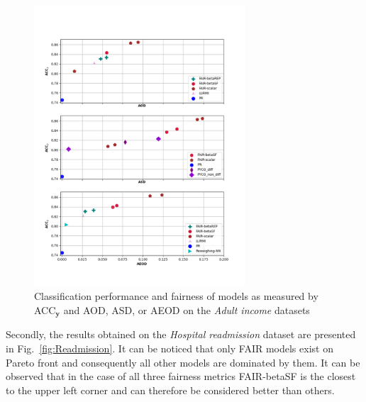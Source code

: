 \documentclass[preprint,12pt]{elsarticle}
\begin{document}
\begin{figure}
	\center
	\includegraphics[angle=0, width=0.7\textwidth]{Adult_ACC.png}
	\captionsetup{justification=centering}
	\caption{Classification performance and fairness of models as measured by ACC$_\mathbf{y}$ and AOD, ASD, or AEOD on the \textit{Adult income} datasets}
	\label{fig:Adult}
	\vskip -0.2in
\end{figure}

Secondly, the results obtained on the \textit{Hospital readmission} dataset are presented in Fig.~\ref{fig:Readmission}. It can be noticed that only FAIR models exist on Pareto front and consequently all other models are dominated by them. It can be observed that in the case of all three fairness metrics FAIR-betaSF is the closest to the upper left corner and can therefore be considered better than others. 
\end{document}
